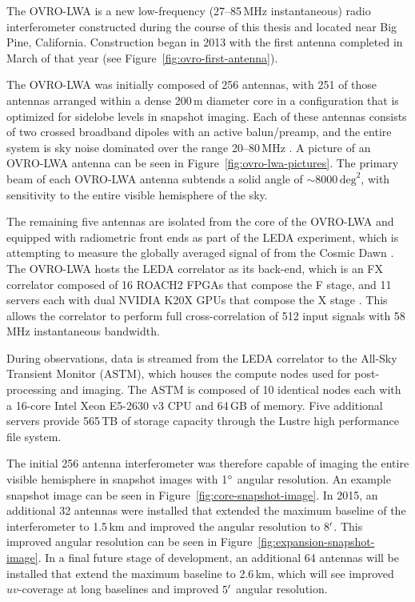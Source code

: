 \begin{bibunit}
The OVRO-LWA is a new low-frequency (27--85\,MHz instantaneous) radio interferometer constructed
during the course of this thesis and located near Big Pine, California. Construction began in 2013
with the first antenna completed in March of that year (see Figure~\ref{fig:ovro-first-antenna}).

The OVRO-LWA was initially composed of 256 antennas, with 251 of those antennas arranged within a
dense 200\,m diameter core in a configuration that is optimized for sidelobe levels in snapshot
imaging.  Each of these antennas consists of two crossed broadband dipoles with an active
balun/preamp, and the entire system is sky noise dominated over the range 20--80\,MHz
\citep{2012PASP..124.1090H}.  A picture of an OVRO-LWA antenna can be seen in
Figure~\ref{fig:ovro-lwa-pictures}. The primary beam of each OVRO-LWA antenna subtends a solid angle
of $\sim 8000\,\text{deg}^2$, with sensitivity to the entire visible hemisphere of the sky.


The remaining five antennas are isolated from the core of the OVRO-LWA and equipped with radiometric
front ends as part of the LEDA experiment, which is attempting to measure the globally averaged
signal of  from the Cosmic Dawn \citep{2018MNRAS.478.4193P}.  The OVRO-LWA hosts the LEDA
correlator as its back-end, which is an FX correlator composed of 16 ROACH2 FPGAs that compose the F
stage, and 11 servers each with dual NVIDIA K20X GPUs that compose the X stage
\citep{2015JAI.....450003K}. This allows the correlator to perform full cross-correlation of 512
input signals with 58\,MHz instantaneous bandwidth.

During observations, data is streamed from the LEDA correlator to the All-Sky Transient Monitor
(ASTM), which houses the compute nodes used for post-processing and imaging.  The ASTM is composed
of 10 identical nodes each with a 16-core Intel Xeon E5-2630 v3 CPU and 64\,GB of memory. Five
additional servers provide 565\,TB of storage capacity through the Lustre high performance file
system.

The initial 256 antenna interferometer was therefore capable of imaging the entire visible
hemisphere in snapshot images with 1$\mbox{$^\circ$}$ angular resolution. An example snapshot image can be
seen in Figure~\ref{fig:core-snapshot-image}.  In 2015, an additional 32 antennas were installed
that extended the maximum baseline of the interferometer to 1.5\,km and improved the angular
resolution to 8$\mbox{$^\prime$}$. This improved angular resolution can be seen in
Figure~\ref{fig:expansion-snapshot-image}. In a final future stage of development, an additional 64
antennas will be installed that extend the maximum baseline to 2.6\,km, which will see improved
$uv$-coverage at long baselines and improved $5\mbox{$^\prime$}$ angular resolution.


\end{bibunit}

